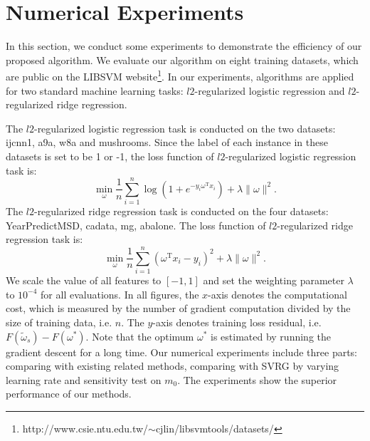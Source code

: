 \documentclass[conference]{IEEEtran}
\begin{document}
 
 \section{Numerical Experiments}
 \label{numexperiments}
 In this section, we conduct some experiments to demonstrate the efficiency of our proposed algorithm. We evaluate our algorithm on eight training datasets, which are public on the LIBSVM website\footnote{http://www.csie.ntu.edu.tw/$\sim$cjlin/libsvmtools/datasets/}. In our experiments, algorithms are applied for two standard machine learning tasks: $l2$-regularized logistic regression and $l2$-regularized ridge regression.
 
 The $l2$-regularized logistic regression task is conducted on the two datasets: ijcnn1, a9a, w8a and mushrooms. Since the label of each instance in these datasets is set to be 1 or -1, the loss function of $l2$-regularized logistic regression task is:
\begin{equation}
\label{logistic_reg}
\min\limits_\omega \frac{1}{n}\sum\limits_{i=1}^n \log(1+e^{-y_i \omega^\mathrm{T} x_i }) + \lambda \parallel \omega \parallel^2.
\end{equation}
The $l2$-regularized ridge regression task is conducted on the four datasets: YearPredictMSD, cadata, mg, abalone. The loss function of $l2$-regularized ridge regression task is:
\begin{equation}
\label{ridge_reg}
\min\limits_\omega \frac{1}{n}\sum\limits_{i=1}^n\left(\omega^{\mathrm{T}}x_i-y_i\right)^2 + \lambda \parallel \omega \parallel^2.
\end{equation}
We scale the value of all features to $[-1,1]$ and set the weighting parameter $\lambda$ to $10^{-4}$ for all evaluations. 
In all figures, the $x$-axis denotes the computational cost, which is measured by the number of gradient computation divided by the size of training data, i.e. $n$. The $y$-axis denotes training loss residual, i.e. $F(\tilde{\omega}_s) - F(\omega^{*})$. Note that the optimum $\omega^*$ is estimated by running the gradient descent for a long time. Our numerical experiments include three parts: comparing with existing related methods, comparing with SVRG by varying learning rate and sensitivity test on $m_0$. The experiments show the superior performance of our methods. 
\end{document}
